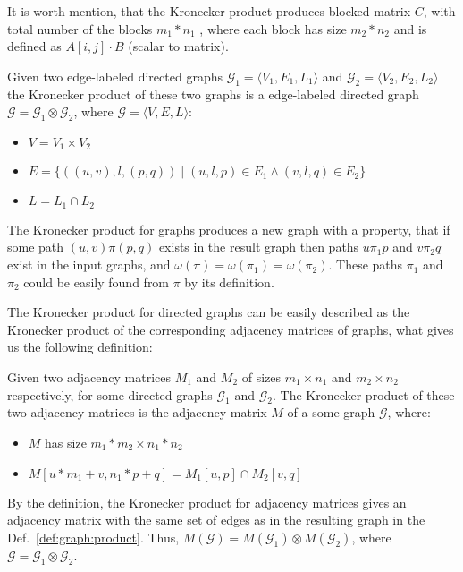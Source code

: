 It is worth mention, that the Kronecker product produces blocked matrix $C$, with total number of the blocks $m_1 * n_1$ , where each block has size $m_2 * n_2$ and is defined as $A[i,j] \cdot B$ (scalar to matrix).

\begin{definition}
\label{def:graph:product}
Given two edge-labeled directed graphs $\mathcal{G}_1=\langle V_1, E_1, L_1 \rangle$ and $\mathcal{G}_2=\langle V_2, E_2, L_2 \rangle$ the Kronecker product of these two graphs is a edge-labeled directed graph $\mathcal{G}=\mathcal{G}_1 \otimes \mathcal{G}_2$, where $\mathcal{G}= \langle V, E, L \rangle$:
\begin{itemize}
    \item $V = V_1 \times V_2$
    \item $E = \{((u,v),l,(p,q)) \mid (u,l,p) \in E_1 \wedge (v,l,q) \in E_2 \}$
    \item $L = L_1 \cap L_2$
\end{itemize}
\end{definition}

The Kronecker product for graphs produces a new graph with a property, that if some path $(u,v)\pi(p,q)$ exists in the result graph then paths $u\pi_1p$ and $v\pi_2q$ exist in the input graphs, and $\omega(\pi) = \omega(\pi_1) = \omega(\pi_2)$. These paths $\pi_1$ and $\pi_2$ could be easily found from $\pi$ by its definition.

The Kronecker product for directed graphs can be easily described as the Kronecker product of the corresponding adjacency matrices of graphs, what gives us the following definition:

\begin{definition}
Given two adjacency matrices $M_1$ and $M_2$ of  sizes $m_1 \times n_1$ and $m_2 \times n_2$ respectively, for some directed graphs $\mathcal{G}_1$ and $\mathcal{G}_2$. 
The Kronecker product of these two adjacency matrices is the adjacency matrix $M$ of a some graph $\mathcal{G}$, where:
\begin{itemize}
    \item $M$ has size $m_1 * m_2 \times n_1 * n_2$
    \item $M[u * m_1 + v,n_1 * p + q] = M_1[u,p] \cap M_2[v,q]$
\end{itemize}
\end{definition}

By the definition, the Kronecker product for adjacency matrices gives an adjacency matrix with the same set of edges as in the resulting graph in the Def.~\ref{def:graph:product}.
Thus, $M(\mathcal{G}) = M(\mathcal{G}_1) \otimes M(\mathcal{G}_2)$, where $\mathcal{G} = \mathcal{G}_1 \otimes \mathcal{G}_2$.

